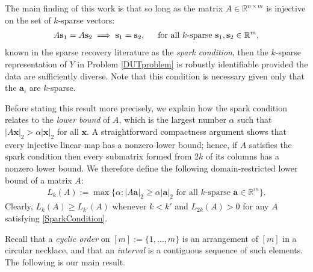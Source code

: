 \documentclass[journal, onecolumn]{IEEEtran}
\begin{document}
The main finding of this work is that so long as the matrix $A \in \mathbb{R}^{n \times m}$ is injective on the set of $k$-sparse vectors: 
\begin{align}\label{SparkCondition}
A\mathbf{s}_1 = A\mathbf{s}_2 \implies \mathbf{s}_1 = \mathbf{s}_2,\indent \text{for all $k$-sparse } \mathbf{s}_1, \mathbf{s}_2 \in \mathbb{R}^m,
\end{align}
known in the sparse recovery literature as the \emph{spark condition}, then the $k$-sparse representation of $Y$ in Problem \ref{DUTproblem} is robustly identifiable provided the data are sufficiently diverse. Note that this condition is necessary given only that the $\mathbf{a}_i$ are $k$-sparse. 

Before stating this result more precisely, we explain how the spark condition relates to the \emph{lower bound} \cite{grcar2010matrix} of $A$, which is the largest number $\alpha$ such that $|A\mathbf{x}|_2 > \alpha|\mathbf{x}|_2$ for all $\mathbf{x}$. A straightforward compactness argument shows that every injective linear map has a nonzero lower bound; hence, if $A$ satisfies the spark condition then every submatrix formed from $2k$ of its columns has a nonzero lower bound. We therefore define the following domain-restricted lower bound of a matrix $A$:
\begin{align}
L_k(A) := \max \{ \alpha : |A\mathbf{a}|_2 \geq \alpha|\mathbf{a}|_2 \text{ for all $k$-sparse } \mathbf{a} \in \mathbb{R}^m\}.
\end{align} 
Clearly, $L_k(A) \geq L_{k'}(A)$ whenever $k < k'$ and $L_{2k}(A) > 0$ for any $A$ satisfying \eqref{SparkCondition}. 

Recall that a \textit{cyclic order} on $[m] := \{1, \ldots,m\}$ is an arrangement of $[m]$ in a circular necklace, and that an \textit{interval} is a contiguous sequence of such elements.  The following is our main result.
\end{document}
